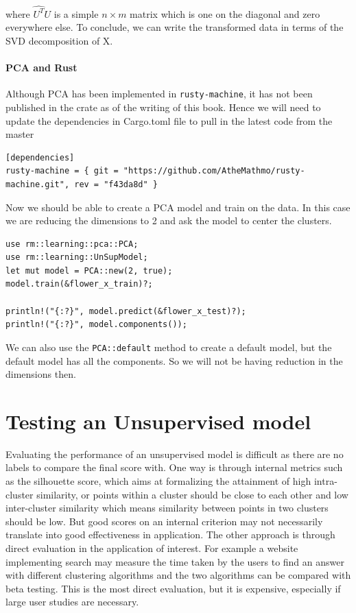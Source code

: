 \documentclass{book}
\begin{document}
where $\hat{U^T}U$ is a simple $n \times m$ matrix which is one on the diagonal and zero everywhere else. To conclude, we can write the transformed data in terms of the SVD decomposition of X\cite{UL:6}.

\label{par:singular_value_decomposition}

\paragraph{PCA and Rust}%
Although PCA has been implemented in \lstinline{rusty-machine}, it has not been published in the crate as of the writing of this book. Hence we will need to update the dependencies in Cargo.toml file to pull in the latest code from the master

\begin{lstlisting}[caption={Cargo.toml}]
[dependencies]
rusty-machine = { git = "https://github.com/AtheMathmo/rusty-machine.git", rev = "f43da8d" }
\end{lstlisting}

Now we should be able to create a PCA model and train on the data. In this case we are reducing the dimensions to 2 and ask the model to center the clusters.

\begin{lstlisting}[caption={rusty\_machine\_unsupervised}]
use rm::learning::pca::PCA;
use rm::learning::UnSupModel;
let mut model = PCA::new(2, true);
model.train(&flower_x_train)?;

println!("{:?}", model.predict(&flower_x_test)?);
println!("{:?}", model.components());
\end{lstlisting}

We can also use the \lstinline{PCA::default} method to create a default model, but the default model has all the components. So we will not be having reduction in the dimensions then.

\label{par:pca_and_rust}




\label{sec:principal_component_analysis}

\section{Testing an Unsupervised model}%
Evaluating the performance of an unsupervised model is difficult as there are no labels to compare the final score with. One way is through internal metrics such as the silhouette score, which aims at formalizing the attainment of high intra-cluster similarity, or points within a cluster should be close to each other and low inter-cluster similarity which means similarity between points in two clusters should be low. But good scores on an internal criterion may not necessarily translate into good effectiveness in application. The other approach is through direct evaluation in the application of interest. For example a website implementing search may measure the time taken by the users to find an answer with different clustering algorithms and the two algorithms can be compared with beta testing. This is the most direct evaluation, but it is expensive, especially if large user studies are necessary.
\end{document}
